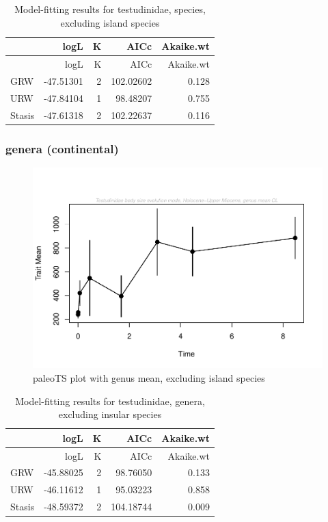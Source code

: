\documentclass[]{article}
\begin{document}
\begin{longtable}[]{@{}lrrrr@{}}
\caption{Model-fitting results for testudinidae, species, excluding
island species}\tabularnewline
\toprule
& logL & K & AICc & Akaike.wt\tabularnewline
\midrule
\endfirsthead
\toprule
& logL & K & AICc & Akaike.wt\tabularnewline
\midrule
\endhead
GRW & -47.51301 & 2 & 102.02602 & 0.128\tabularnewline
URW & -47.84104 & 1 & 98.48207 & 0.755\tabularnewline
Stasis & -47.61318 & 2 & 102.22637 & 0.116\tabularnewline
\bottomrule
\end{longtable}

\newpage

\subsubsection{genera (continental)}\label{genera-continental}

\begin{figure}[htbp]
\centering
\includegraphics{MA_JJ_files/figure-latex/paleoTS plot with genus mean, excluding island species-1.pdf}
\caption{paleoTS plot with genus mean, excluding island species}
\end{figure}

\begin{longtable}[]{@{}lrrrr@{}}
\caption{Model-fitting results for testudinidae, genera, excluding
insular species}\tabularnewline
\toprule
& logL & K & AICc & Akaike.wt\tabularnewline
\midrule
\endfirsthead
\toprule
& logL & K & AICc & Akaike.wt\tabularnewline
\midrule
\endhead
GRW & -45.88025 & 2 & 98.76050 & 0.133\tabularnewline
URW & -46.11612 & 1 & 95.03223 & 0.858\tabularnewline
Stasis & -48.59372 & 2 & 104.18744 & 0.009\tabularnewline
\bottomrule
\end{longtable}
\end{document}
